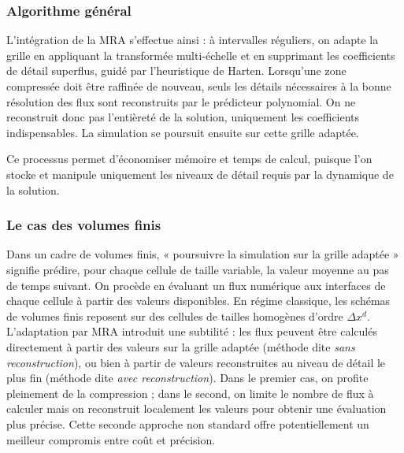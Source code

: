 \subsubsection{Algorithme général}
L'intégration de la MRA s'effectue ainsi : à intervalles réguliers, on adapte la grille en appliquant la transformée multi-échelle et en supprimant les coefficients de détail superflus, guidé par l'heuristique de Harten. 
Lorsqu'une zone compressée doit être raffinée de nouveau, seuls les détails nécessaires à la bonne résolution des flux sont reconstruits par le prédicteur polynomial. 
On ne reconstruit donc pas l'entièreté de la solution, uniquement les coefficients indispensables. La simulation se poursuit ensuite sur cette grille adaptée.

Ce processus permet d'économiser mémoire et temps de calcul, puisque l'on stocke et manipule uniquement les niveaux de détail requis par la dynamique de la solution.

\subsubsection{Le cas des volumes finis}
Dans un cadre de volumes finis, « poursuivre la simulation sur la grille adaptée » signifie prédire, pour chaque cellule de taille variable, 
la valeur moyenne au pas de temps suivant. On procède en évaluant un flux numérique aux interfaces de chaque cellule à partir des valeurs disponibles.
En régime classique, les schémas de volumes finis reposent sur des cellules de tailles homogènes d'ordre $\Delta x^d$. 
L'adaptation par MRA introduit une subtilité : les flux peuvent être calculés directement à partir des valeurs sur la grille adaptée (méthode dite \emph{sans reconstruction}), 
ou bien à partir de valeurs reconstruites au niveau de détail le plus fin (méthode dite \emph{avec reconstruction}). 
Dans le premier cas, on profite pleinement de la compression ; dans le second, on limite le nombre de flux à calculer mais on reconstruit localement les valeurs pour obtenir une évaluation plus précise. 
Cette seconde approche non standard offre potentiellement un meilleur compromis entre coût et précision.

